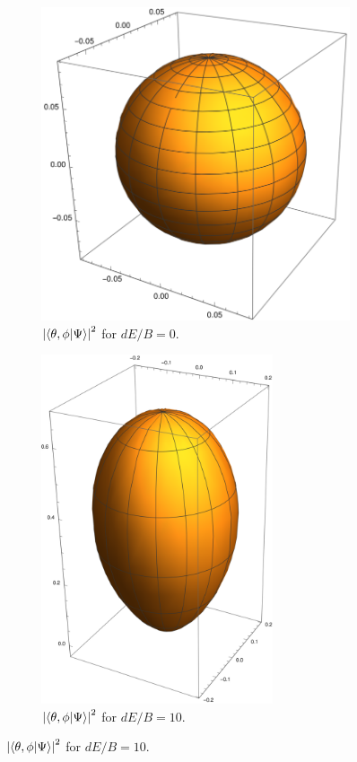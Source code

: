 \documentclass{article}
\theoremstyle{definition}
\begin{document}
\begin{figure}[!htb]
		\centering
		\begin{subfigure}{.5\textwidth}
			\centering
			\includegraphics[width=0.9\linewidth]{e0.eps}
			\caption{$\abs{\bra{\theta,\phi}\ket{\Psi}}^2$ for $dE/B=0$.}
			\label{fig:0}
		\end{subfigure}%
		\begin{subfigure}{.5\textwidth}
			\centering
			\includegraphics[width=0.75\textwidth]{e10.eps}
			\caption{$\abs{\bra{\theta,\phi}\ket{\Psi}}^2$ for $dE/B=10$.}
			\label{fig:10}
		\end{subfigure}
\end{figure}
\end{document}
